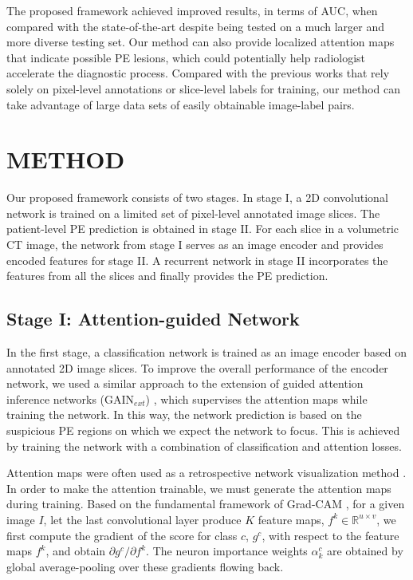 \documentclass{midl} %
\begin{document}
The proposed framework achieved improved results, in terms of AUC, when compared with the state-of-the-art \cite{Huang2019PENet} despite being tested on a much larger and more diverse testing set. Our method can also provide localized attention maps that indicate possible PE lesions, which could potentially help radiologist accelerate the diagnostic process.
Compared with the previous works that rely solely on pixel-level annotations or slice-level labels \cite{tajbakhsh2015computer, Huang2019PENet} for training, our method can take advantage of large data sets of easily obtainable image-label pairs.

\section{METHOD}
\label{sec:method}

Our proposed framework consists of two stages. In stage I, a 2D convolutional network is trained on a limited set of pixel-level annotated image slices. The patient-level PE prediction is obtained in stage II. For each slice in a volumetric CT image, the network from stage I serves as an image encoder and provides encoded features for stage II. A recurrent network in stage II incorporates the features from all the slices and finally provides the PE prediction.

\subsection{Stage I: Attention-guided Network}
\label{ssec:stage1}

In the first stage, a classification network is trained as an image encoder based on annotated 2D image slices. To improve the overall performance of the encoder network, we used a similar approach to the extension of guided attention inference networks (GAIN$_{ext}$) \cite{li2018tell}, which supervises the attention maps while training the network. In this way, the network prediction is based on the suspicious PE regions on which we expect the network to focus. This is achieved by training the network with a combination of  classification and attention losses.

Attention maps were often used as a retrospective network visualization method \cite{zhou2016learning,selvaraju2017grad,gondal2017weakly,guan2018diagnose}. In order to make the attention trainable, we must generate the attention maps during training. Based on the fundamental framework of Grad-CAM \cite{selvaraju2017grad}, for a given image $I$, let the last convolutional layer produce $K$ feature maps, $f^{k} \in \mathbb{R}^{u \times v}$, we first compute the gradient of the score for class $c$, $g^{c}$, with respect to the feature maps $f^{k}$, and obtain ${\partial g^{c}}/{\partial f^{k}}$. The neuron importance weights $\alpha ^{c}_{k}$ are obtained by global average-pooling over these gradients flowing back.
\end{document}
